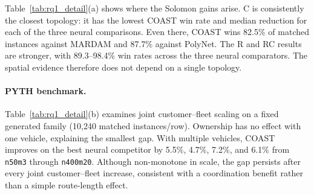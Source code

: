 \documentclass[letterpaper]{article}
\begin{document}
Table~\ref{tab:rq1_detail}(a) shows where the Solomon gains arise. C is consistently the closest topology: it has the lowest COAST win rate and median reduction for each of the three neural comparisons. Even there, COAST wins 82.5\% of matched instances against MARDAM and 87.7\% against PolyNet. The R and RC results are stronger, with 89.3--98.4\% win rates across the three neural comparators. The spatial evidence therefore does not depend on a single topology.

\paragraph{PYTH benchmark.} Table~\ref{tab:rq1_detail}(b) examines joint customer--fleet scaling on a fixed generated family (10,240 matched instances/row). Ownership has no effect with one vehicle, explaining the smallest gap. With multiple vehicles, COAST improves on the best neural competitor by 5.5\%, 4.7\%, 7.2\%, and 6.1\% from \texttt{n50m3} through \texttt{n400m20}. Although non-monotone in scale, the gap persists after every joint customer--fleet increase, consistent with a coordination benefit rather than a simple route-length effect.
\end{document}
